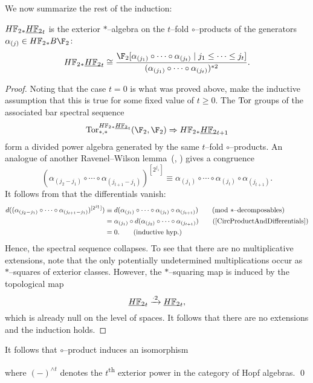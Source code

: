 We now summarize the rest of the induction:
\begin{theorem}\label{UnstableSteenrodInduction}
\(\HFtwo_* \OS{\HFtwo}{t}\) is the exterior \(\ast\)--algebra on the \(t\)--fold \(\circ\)--products of the generators \(\alpha_{(j)} \in \HFtwo_* B\F_2\): \[\HFtwo_* \OS{\HFtwo}{t} \cong \frac{\F_2[\alpha_{(j_1)} \circ \cdots \circ \alpha_{(j_t)} \mid j_1 \le \cdots \le j_t]}{(\alpha_{(j_1)} \circ \cdots \circ \alpha_{(j_t)})^{\ast 2}}.\]
\end{theorem}
\begin{proof}
Noting that the case \(t = 0\) is what was proved above, make the inductive assumption that this is true for some fixed value of \(t \ge 0\).  The \(\operatorname{Tor}\) groups of the associated bar spectral sequence \[\Tor^{\HFtwo_* \OS{\HFtwo}{t}}_{*, *}(\F_2, \F_2) \Rightarrow \HFtwo_* \OS{\HFtwo}{t+1}\] form a divided power algebra generated by the same \(t\)--fold \(\circ\)--products.  An analogue of another Ravenel--Wilson lemma~(\cite[Lemma 9.5]{RavenelWilsonKthyOfEMSpaces}, \cite[Claim 8.16]{Wilson}) gives a congruence \[(\alpha_{(j_2-j_1)} \circ \cdots \circ \alpha_{(j_{t+1}-j_1)})^{[2^{j_1}]} \equiv \alpha_{(j_1)} \circ \cdots \circ \alpha_{(j_t)} \circ \alpha_{(j_{t+1})} \tag{mod \(\ast\)--decomposables}.\]  It follows from  that the differentials vanish:
\begin{align*}
d((\alpha_{(j_2-j_1)} \circ \cdots \circ \alpha_{(j_{t+1}-j_1)})^{[2^{j_1}]}) & \equiv d(\alpha_{(j_1)} \circ \cdots \circ \alpha_{(j_t)} \circ \alpha_{(j_{t+1})}) \tag{mod \(\ast\)--decomposables} \\
& = \alpha_{(j_1)} \circ d(\alpha_{(j_2)} \circ \cdots \circ \alpha_{(j_{t+1})}) \tag{\Cref{CircProductAndDifferentials}} \\
& = 0. \tag{inductive hyp.}
\end{align*}
Hence, the spectral sequence collapses.  To see that there are no multiplicative extensions, note that the only potentially undetermined multiplications occur as \(\ast\)--squares of exterior classes.  However, the \(\ast\)--squaring map is induced by the topological map \[\OS{\HFtwo}{t} \xrightarrow{\cdot 2} \OS{\HFtwo}{t},\] which is already null on the level of spaces.  It follows that there are no extensions and the induction holds.
\end{proof}

\begin{corollary}\label{CalculationOfUnstableSteenrodHopfRing}
It follows that \(\circ\)--product induces an isomorphism
\begin{center}
\end{center}
where \((-)^{\wedge t}\) denotes the \(t\)\textsuperscript{th} exterior power in the category of Hopf algebras. \qed
\end{corollary}

